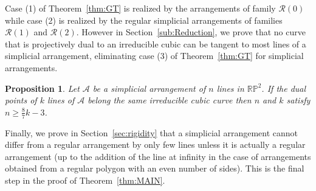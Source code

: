 \documentclass[a4paper,11pt,reqno]{amsart}
\newtheorem{prop}[thm]{Proposition}
\theoremstyle{definition}
\theoremstyle{remark}
\theoremstyle{definition}
\theoremstyle{definition}
\theoremstyle{definition}
\numberwithin{equation}{section}
\begin{document}





\par

Case (1) of Theorem~\ref{thm:GT} is realized by the arrangements of family $\mathcal{R}(0)$ while case (2) is realized by the regular simplicial arrangements of families $\mathcal{R}(1)$ and $\mathcal{R}(2)$. However in Section~\ref{sub:Reduction}, we prove that no curve that is projectively dual to an irreducible cubic can be tangent to most lines of a simplicial arrangement, eliminating case (3) of Theorem~\ref{thm:GT} for simplicial arrangements.

\begin{prop}\label{prop:irreducible}
Let $\mathcal{A}$ be a simplicial arrangement of $n$ lines in $\mathbb{RP}^{2}$. If the dual points of $k$ lines of $\mathcal{A}$ belong the same irreducible cubic curve then $n$ and $k$ satisfy $n \geq \frac{8}{7}k-3$.
\end{prop}

Finally, we prove in Section~\ref{sec:rigidity} that a simplicial arrangement cannot differ from a regular arrangement by only few lines unless it is actually a regular arrangement (up to the addition of the line at infinity in the case of arrangements obtained from a regular polygon with an even number of sides). This is the  final step in the proof of Theorem~\ref{thm:MAIN}.\newline
\end{document}
